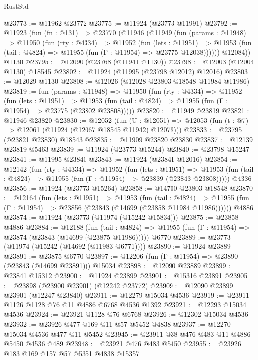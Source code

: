 \begin{lexlean}{RustStd}
\begin{coremodule}
@23773 := @11962 @23772
@23775 := @11924 (@23773 @11991)
@23792 := @11923
    (fun (fn : @131) =>
    @23770
      (@11946
        (@11949
          (fun (params : @11948) =>
          @11950
            (fun (rty : @4334) =>
            @11952
              (fun (lets : @11951) =>
              @11953 (fun (tail : @4824) => @11955 (fun (Γ : @11954) => @23775 @12038))))))
        @12084))
    @1130
@23795 := @12090 (@23768 (@11941 @1130))
@23798 := @12003 (@12004 @1130) @18545
@23802 := @11924 (@11995 (@23798 @12012) @12016)
@23803 := @12029 @1130
@23808 := @12026 (@12028 @23803 @18548 @11984 @11986)
@23819 := fun (params : @11948) =>
  @11950
    (fun (rty : @4334) =>
    @11952
      (fun (lets : @11951) =>
      @11953 (fun (tail : @4824) => @11955 (fun (Γ : @11954) => @23775 (@23802 @23808)))))
@23820 := @11949 @23819
@23821 := @11946 @23820
@23830 := @12052
    (fun (U : @12051) => @12053 (fun (t : @7) => @12061 (@11924 (@12067 @18545 @11942) @12078)))
@23833 := @23795 (@23821 @23830) @18543
@23835 := @11909 @23820 @23830
@23837 := @12139 @23819 @5463
@23839 := @11924 (@23773 @15244)
@23840 := @23798 @15247
@23841 := @11995 @23840
@23843 := @11924 (@23841 @12016)
@23854 := @12142
    (fun (rty : @4334) =>
    @11952
      (fun (lets : @11951) =>
      @11953 (fun (tail : @4824) => @11955 (fun (Γ : @11954) => @23839 (@23843 @23808)))))
    @4336
@23856 := @11924 (@23773 @15264)
@23858 := @14700 @23803 @18548
@23870 := @12164
    (fun (lets : @11951) =>
    @11953
      (fun (tail : @4824) =>
      @11955 (fun (Γ : @11954) => @23856 (@23843 (@14699 (@23858 @11984 @11986))))))
    @4886
@23874 := @11924 (@23773 (@11974 (@15242 @15834)))
@23875 := @23858 @4886
@23884 := @12188
    (fun (tail : @4824) => @11955 (fun (Γ : @11954) => @23874 (@23843 (@14699 (@23875 @11986)))))
    @6770
@23889 := @23773 (@11974 (@15242 (@14692 (@11983 @6771))))
@23890 := @11924 @23889
@23891 := @23875 @6770
@23897 := @12206 (fun (Γ : @11954) => @23890 (@23843 (@14699 @23891))) @15034
@23898 := @12090 @23889
@23899 := @23841 @15312
@23900 := @11924 @23899
@23901 := @15316 @23891
@23905 := @23898 (@23900 @23901) (@12242 @23772)
@23909 := @12090 @23899 @23901 (@12247 @23840)
@23911 := @12279 @15034 @4536
@23919 := @23911 @1126 @1128 @76 @11 @4886 @6768 @4536 @1392
@23921 := @12293 @15034 @4536
@23924 := @23921 @1128 @76 @6768
@23926 := @12302 @15034 @4536
@23932 := @23926 @477 @169 @11 @57 @5452 @4838
@23937 := @12270 @15034 @4536 @477 @11 @5452
@23945 := @23911 @38 @476 @483 @11 @4886 @5450 @4536 @489
@23948 := @23921 @476 @483 @5450
@23955 := @23926 @183 @169 @157 @57 @5351 @4838 @15357

\end{coremodule}
\end{lexlean}
